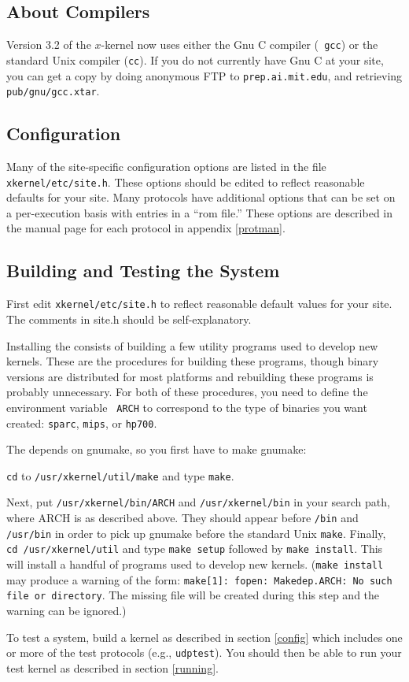 \subsection{About Compilers}

Version 3.2 of the $x$-kernel now uses either the Gnu C compiler ({\tt
gcc}) or the standard Unix compiler ({\tt cc}).  If you do not
currently have Gnu C at your site, you can get a copy by doing
anonymous FTP to {\tt prep.ai.mit.edu}, and retrieving {\tt
pub/gnu/gcc.xtar}.


\subsection{ Configuration }

Many of the site-specific configuration options are listed in the file
{\tt xkernel/etc/site.h}.  These options should be edited to reflect
reasonable defaults for your site.  Many protocols have additional
options that can be set on a per-execution basis with entries in a
``rom file.''  These options are described in the manual page for each
protocol in appendix \ref{protman}.


\subsection{Building and Testing the System}

First edit {\tt xkernel/etc/site.h} to reflect reasonable default values for
your site.  The comments in site.h should be self-explanatory.

Installing the \xk{} consists of building a few utility programs used
to develop new kernels.  These are the procedures for building these
programs, though binary versions are distributed for most platforms
and rebuilding these programs is probably unnecessary.  For both of
these procedures, you need to define the environment variable {\tt
ARCH} to correspond to the type of binaries you want created:  
{\tt sparc}, {\tt mips}, or {\tt hp700}.

The \xk{} depends on gnumake, so you first have to make gnumake:
\medskip

{\tt cd} to {\tt /usr/xkernel/util/make} and type {\tt make}.  
\medskip

Next, put {\tt /usr/xkernel/bin/ARCH} and {\tt /usr/xkernel/bin}
in your search path, where ARCH is as described above.
They should appear before {\tt /bin} and {\tt /usr/bin} in
order to pick up gnumake before the standard Unix {\tt make}. Finally,
{\tt cd~/usr/xkernel/util} and type {\tt make~setup} followed by 
{\tt make~install}.  This will install a handful of programs used to
develop new kernels.  ({\tt make~install} may produce a warning of the
form:  {\tt make[1]: fopen: Makedep.ARCH: No such file or directory}.
The missing file will be created during this step and the warning can
be ignored.)


To test a system, build a kernel as described in section
\ref{config} which includes one or more of the test protocols 
(e.g., {\tt udptest}).  You should then be able to run your test
kernel as described in section \ref{running}.

